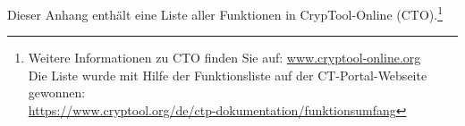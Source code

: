 \noindent Dieser Anhang enthält eine Liste aller
Funktionen in CrypTool-Online (CTO).\footnote{%
  Weitere Informationen zu CTO finden Sie auf:
  \url{www.cryptool-online.org} \\
  Die Liste wurde mit Hilfe der Funktionsliste auf der CT-Portal-Webseite gewonnen:\\
  \url{https://www.cryptool.org/de/ctp-dokumentation/funktionsumfang}}




